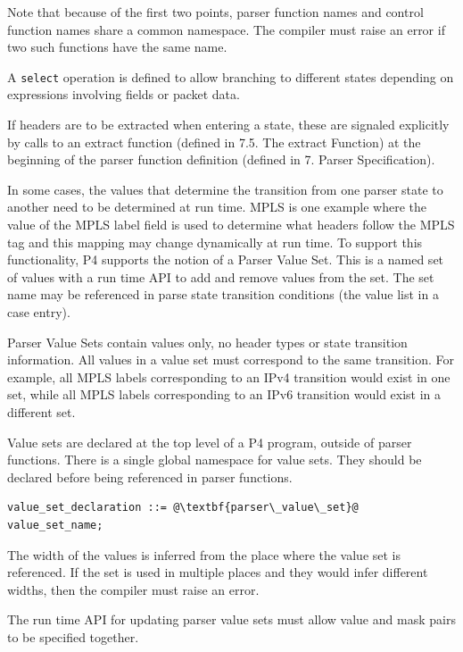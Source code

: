 \documentclass[12pt]{article}
\begin{document}
Note that because of the first two points, parser function names and
control function names share a common namespace.  The compiler must
raise an error if two such functions have the same name.

A \texttt{select} operation is defined to allow branching to different
states depending on expressions involving fields or packet data.

If headers are to be extracted when entering a state, these are
signaled explicitly by calls to an extract function (defined in
7.5. The extract Function) at the beginning of the parser function
definition (defined in 7. Parser Specification).


In some cases, the values that determine the transition from one
parser state to another need to be determined at run time. MPLS is one
example where the value of the MPLS label field is used to determine
what headers follow the MPLS tag and this mapping may change
dynamically at run time. To support this functionality, P4 supports
the notion of a Parser Value Set. This is a named set of values with a
run time API to add and remove values from the set. The set name may
be referenced in parse state transition conditions (the value list in
a case entry).

Parser Value Sets contain values only, no header types or state transition 
information. All values in a value set must correspond to the same transition. 
For example, all MPLS labels corresponding to an IPv4 transition would exist 
in one set, while all MPLS labels corresponding to an IPv6 transition would 
exist in a different set.

Value sets are declared at the top level of a P4 program, outside of parser 
functions. There is a single global namespace for value sets. They should 
be declared before being referenced in parser functions.

\begin{lstlisting}[frame=single,backgroundcolor=\color{bnfgreen},escapechar=\@]
value_set_declaration ::= @\textbf{parser\_value\_set}@ value_set_name;
\end{lstlisting}

The width of the values is inferred from the place where the value set is 
referenced.  If the set is used in multiple places and they would infer
different widths, then the compiler must raise an error.

The run time API for updating parser value sets must allow value and mask
pairs to be specified together.
\end{document}
